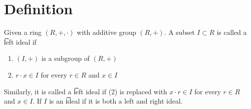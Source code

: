 
\section*{Definition}

Given a ring $(R, +, \cdot )$ with additive group $(R, +)$.
A subset $I \subset R$ is called a \t{left ideal} if
    \begin{enumerate}
      \item $(I, +)$ is a subgroup of $(R, +)$
      \item $r\cdot x \in I$ for every $r \in R$ and $x \in I$
    \end{enumerate}
Similarly, it is called a \t{left ideal} if (2) is replaced with $x \cdot  r \in I$ for every $r \in R$ and $x \in I$.
If $I$ is an \t{ideal} if it is both a left and right ideal.


\blankpage